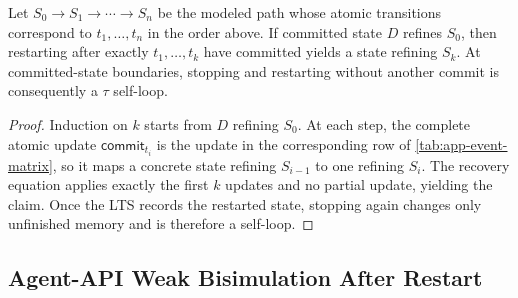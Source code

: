 \begin{lemma}
\label{lem:app-restart}
Let \(S_0\to S_1\to\cdots\to S_n\) be the modeled path whose atomic transitions correspond to \(t_1,\ldots,t_n\) in the order above.
If committed state \(D\) refines \(S_0\), then restarting after exactly \(t_1,\ldots,t_k\) have committed yields a state refining \(S_k\).
At committed-state boundaries, stopping and restarting without another commit is consequently a \(\tau\) self-loop.
\end{lemma}

\begin{proof}
Induction on \(k\) starts from \(D\) refining \(S_0\).
At each step, the complete atomic update \(\mathsf{commit}_{t_i}\) is the update in the corresponding row of \cref{tab:app-event-matrix}, so it maps a concrete state refining \(S_{i-1}\) to one refining \(S_i\).
The recovery equation applies exactly the first \(k\) updates and no partial update, yielding the claim.
Once the LTS records the restarted state, stopping again changes only unfinished memory and is therefore a self-loop.
\end{proof}

\subsection{Agent-API Weak Bisimulation After Restart}
\label{app:bisimulation}

